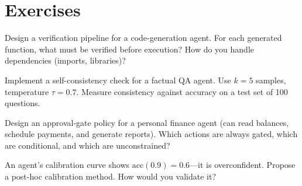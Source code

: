 \section{Exercises}

\begin{exercise}
	Design a verification pipeline for a code-generation agent. For each generated function, what must be verified before execution? How do you handle dependencies (imports, libraries)?
\end{exercise}

\begin{exercise}
	Implement a self-consistency check for a factual QA agent. Use $k=5$ samples, temperature $\tau=0.7$. Measure consistency against accuracy on a test set of 100 questions.
\end{exercise}

\begin{exercise}
	Design an approval-gate policy for a personal finance agent (can read balances, schedule payments, and generate reports). Which actions are always gated, which are conditional, and which are unconstrained?
\end{exercise}

\begin{exercise}
	An agent's calibration curve shows $\text{acc}(0.9) = 0.6$---it is overconfident. Propose a post-hoc calibration method. How would you validate it?
\end{exercise}
